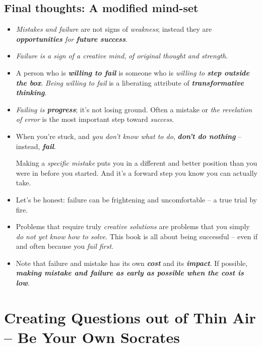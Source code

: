 \documentclass[11pt]{article}
\begin{document}
\subsection{Final thoughts: A modified mind-set}
\begin{itemize}
\item \emph{Mistakes and failure} are not signs of \emph{weakness}; instead they are \emph{\textbf{opportunities} for \textbf{future success}}. 

\item \emph{Failure is a sign of a creative mind}, \emph{of original thought and strength}.

\item A person who is \emph{\textbf{willing to fail}} is someone who is \emph{willing to \textbf{step outside the box}}. \emph{Being willing
to fail} is a liberating attribute of \emph{\textbf{transformative thinking}}.

\item \textit{Failing is \textbf{progress}}; it’s not losing ground. Often a mistake or \emph{the revelation of error} is the most important step toward \emph{success}. 

\item When you’re stuck, and \emph{you don’t know what to do}, \emph{\textbf{don’t do nothing}} -- instead, \emph{\textbf{fail}}. 

Making a \emph{specific mistake} puts you in a different and better position than you were in before you started. And it’s a forward step you know you can actually take.

\item Let’s be honest: failure can be frightening and uncomfortable -- a true trial by fire. 

\item Problems that require truly \emph{creative solutions} are problems that you simply \emph{do not yet know how to solve}. This book is all about being successful -- even if and often because you \emph{fail first}.

\item Note that failure and mistake has its own \emph{\textbf{cost}} and its \emph{\textbf{impact}}. If possible, \emph{\textbf{making mistake and failure as early as possible when the cost is low}}. 
\end{itemize}

\section{Creating Questions out of Thin Air -- Be Your Own Socrates}
\end{document}
